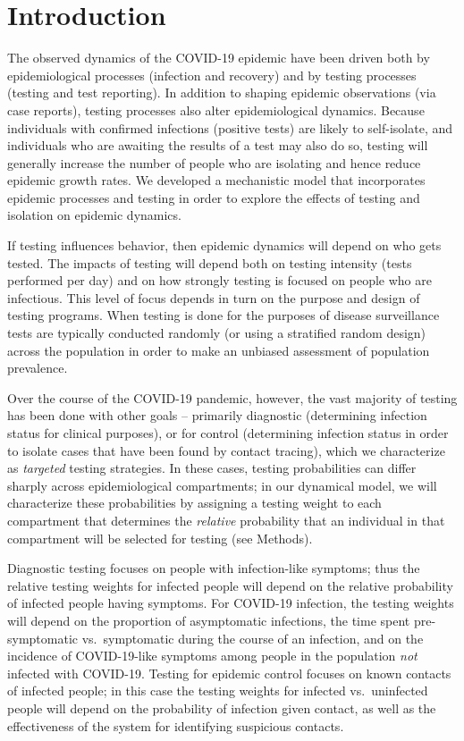 \documentclass[12pt]{article}
\newcommand{\covid}{COVID-19\xspace}
\DeclareRobustCommand\_{\ifmmode\expandafter\subtxt\else\textunderscore\fi}
\theoremstyle{definition} %
\begin{document}
\section{Introduction}

The observed dynamics of the \covid epidemic have been driven both by epidemiological processes (infection and recovery) and by testing processes (testing and test reporting). In addition to shaping epidemic observations (via case reports), testing processes also alter epidemiological dynamics. Because individuals with confirmed infections (positive tests) are likely to self-isolate, and individuals who are awaiting the results of a test may also do so, testing will generally increase the number of people who are isolating and hence reduce epidemic growth rates. We developed a mechanistic model that incorporates epidemic processes and testing in order to explore the effects of testing and isolation on epidemic dynamics.

If testing influences behavior, then epidemic dynamics will depend on who gets tested.
The impacts of testing will depend both on testing intensity (tests performed per day) and on how strongly testing is focused on people who are infectious.
This level of focus depends in turn on the purpose and design of testing programs. 
When testing is done for the purposes of disease surveillance \citep{foddai2020base}
tests are typically conducted randomly (or using a stratified random design) across the population in order to make an unbiased assessment of population prevalence.

Over the course of the \covid pandemic, however, the vast majority of testing has been done with other goals --
primarily diagnostic (determining infection status for clinical purposes), or for control (determining  infection status in order to isolate cases that have been found by contact tracing), which we characterize as \emph{targeted} testing strategies.
In these cases, testing probabilities can differ sharply across epidemiological compartments; in our dynamical model, we will characterize these probabilities by assigning a testing weight to each compartment that determines the \emph{relative} probability that an individual in that compartment will be selected for testing (see Methods). 

Diagnostic testing focuses on people with infection-like symptoms; thus the relative testing weights for infected people will depend on the relative probability of infected people having symptoms. For \covid infection, the testing weights will depend on the proportion of asymptomatic infections, the time spent pre-symptomatic vs.\ symptomatic during the course of an infection, and on the incidence of \covid-like symptoms among people in the population \emph{not} infected with \covid. Testing for epidemic control focuses on known contacts of infected people; in this case the testing weights for infected vs.\ uninfected people will depend on the probability of infection given contact, as well as the effectiveness of the system for identifying suspicious contacts.
\end{document}
